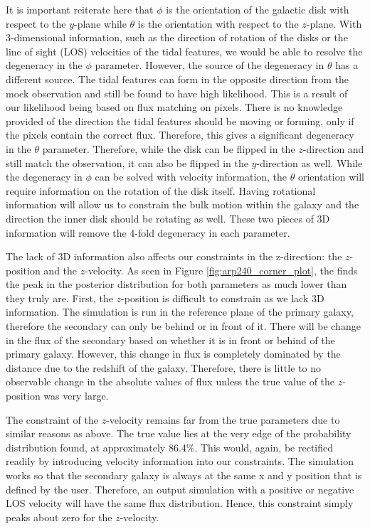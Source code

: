 It is important reiterate here that $\phi$ is the orientation of the galactic disk with respect to the $y$-plane while $\theta$ is the orientation with respect to the $z$-plane. With 3-dimensional information, such as the direction of rotation of the disks or the line of sight (LOS) velocities of the tidal features, we would be able to resolve the degeneracy in the $\phi$ parameter. However, the source of the degeneracy in $\theta$ has a different source. The tidal features can form in the opposite direction from the mock observation and still be found to have high likelihood. This is a result of our likelihood being based on flux matching on pixels. There is no knowledge provided of the direction the tidal features should be moving or forming, only if the pixels contain the correct flux. Therefore, this gives a significant degeneracy in the $\theta$ parameter. Therefore, while the disk can be flipped in the $z$-direction and still match the observation, it can also be flipped in the $y$-direction as well. While the degeneracy in $\phi$ can be solved with velocity information, the $\theta$ orientation will require information on the rotation of the disk itself. Having rotational information will allow us to constrain the bulk motion within the galaxy and the direction the inner disk should be rotating as well. These two pieces of 3D information will remove the 4-fold degeneracy in each parameter.

The lack of 3D information also affects our constraints in the z-direction: the $z$-position and the $z$-velocity. As seen in Figure \ref{fig:arp240_corner_plot}, the finds the peak in the posterior distribution for both parameters as much lower than they truly are. First, the $z$-position is difficult to constrain as we lack 3D information. The simulation is run in the reference plane of the primary galaxy, therefore the secondary can only be behind or in front of it. There will be change in the flux of the secondary based on whether it is in front or behind of the primary galaxy. However, this change in flux is completely dominated by the distance due to the redshift of the galaxy. Therefore, there is little to no observable change in the absolute values of flux unless the true value of the $z$-position was very large.

The constraint of the $z$-velocity remains far from the true parameters due to similar reasons as above. The true value lies at the very edge of the probability distribution found, at approximately 86.4\%. This would, again, be rectified readily by introducing velocity information into our constraints. The simulation works so that the secondary galaxy is always at the same x and y position that is defined by the user. Therefore, an output simulation with a positive or negative LOS velocity will have the same flux distribution. Hence, this constraint simply peaks about zero for the $z$-velocity.

